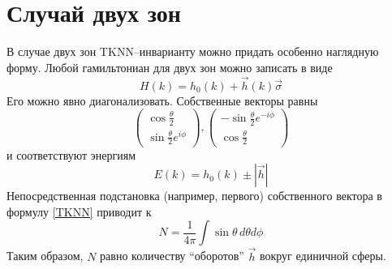 \section{Случай двух зон}
В случае двух зон $\mathrm{TKNN}$--инварианту можно придать особенно наглядную 
форму. Любой гамильтониан для двух зон можно записать в виде
\begin{equation}
    H(k) = h_0(k) + \vec{h}(k)\vec{\sigma}
\end{equation}
Его можно явно диагонализовать. Собственные векторы равны
\begin{equation}
    \left(\begin{matrix}
        \cos{\frac{\theta}{2}} \\
        \sin{\frac{\theta}{2}}e^{i\phi}
    \end{matrix}\right),
    \left(\begin{matrix}
        -\sin{\frac{\theta}{2}}e^{-i\phi}\\
        \cos{\frac{\theta}{2}} 
    \end{matrix}\right)
\end{equation}
и соответствуют энергиям 
\begin{equation}
    E(k) = h_0(k) \pm |\vec{h}|
\end{equation}
Непосредственная подстановка (например, первого) собственного вектора в формулу \eqref{TKNN}
приводит к 
\begin{equation}
    N = \frac{1}{4\pi} \int \sin{\theta}\,d\theta d\phi
\end{equation}
Таким образом, $N$ равно количеству ``оборотов'' $\vec{h}$ вокруг единичной сферы.
